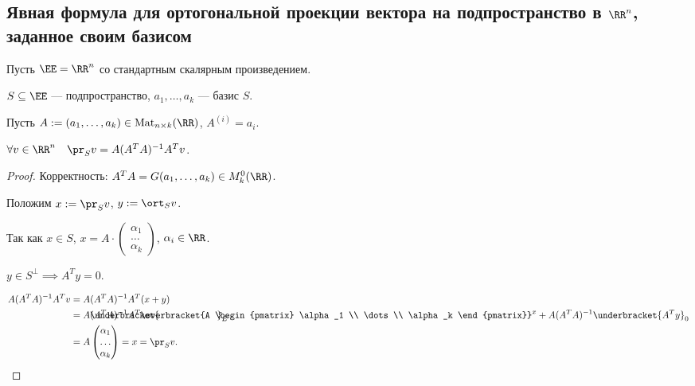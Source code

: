 \begin{comment}
    \hyperref[lec22:gram-schmidt_second_property]{Свойство 2} из метода Грама-Шмидта говорит, что 
    \begin{equation*}
        f_i = e_i - \pr_{\left< f_1, \dots, f_{i - 1}\right>} e_i = \ort_{\left< f_1, \dots, f_{i - 1} \right>} e_i
    .\end{equation*}
\end{comment}


\subsection{Явная формула для ортогональной проекции вектора на подпространство в $\RR^n$, заданное своим базисом}

Пусть $\EE = \RR^n$ со стандартным скалярным произведением.

$S \subseteq \EE$ --- подпространство, $a_1, \dots, a_k$ --- базис $S$.

Пусть $A := (a_1, \dots, a_k) \in \text{Mat}_{n \times k}(\RR)$, $A^{(i)} = a_i$.

\begin{proposal}
    $\forall v \in \RR^n \quad \pr_S v = A (A^{T} A)^{-1} A^{T} v$.
\end{proposal}

\begin{proof}
    Корректность: $A^{T} A = G(a_1, \dots, a_k) \in M_k^{0}(\RR)$.

    Положим $x := \pr_S v$, $y := \ort_S v$.

    Так как $x \in S$, $x = A \cdot \begin{pmatrix} \alpha_1 \\ \dots \\ \alpha_k \end{pmatrix}$, $\alpha_i \in \RR$.

    $y \in S^{\perp} \implies A^T y = 0$.

    \begin{align*}
    A (A^{T} A)^{-1} A^{T} v
    &= A(A^{T}A)^{-1}A^{T} (x + y) \\
    &= A\lefteqn{\underbracket{\phantom{(A^{T}A)^{-1}A^{T} A}}_E} (A^{T} A)^{-1} A^{T} \overbracket{A \begin{pmatrix} \alpha_1 \\ \dots \\ \alpha_k \end{pmatrix}}^{x} + A(A^{T} A)^{-1} \underbracket{A^{T} y}_{0} \\
    &= A \begin{pmatrix} \alpha_1 \\ \dots \\ \alpha_k \end{pmatrix} = x = \pr_S v
    .\end{align*}
\end{proof}


